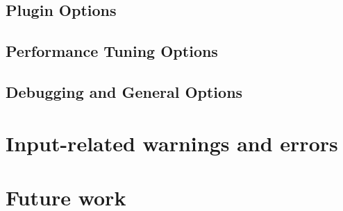 \documentclass[14pt,a4paper, titlepage]{article}
\begin{document}
\subsection{Plugin Options}

\subsection{Performance Tuning Options}

\subsection{Debugging and General Options}



\section{Input-related warnings and errors}
\label{sec:inputRelatedWarnings}

\section{Future work}
\label{sec:future}
\end{document}
